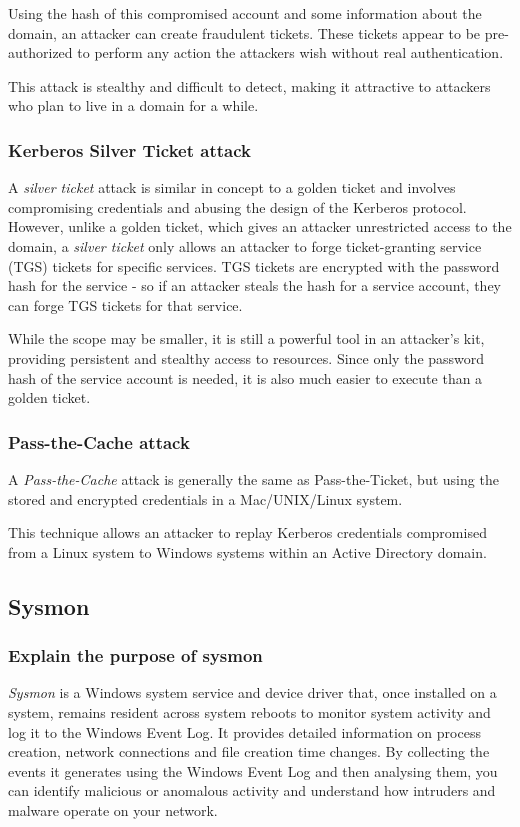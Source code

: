 Using the hash of this compromised account and some information about the domain, an attacker can create fraudulent tickets. These tickets appear to be pre-authorized to perform any action the attackers wish without real authentication.

This attack is stealthy and difficult to detect, making it attractive to attackers who plan to live in a domain for a while.

\subsubsection{Kerberos Silver Ticket attack}
A \textit{silver ticket} attack is similar in concept to a golden ticket and involves compromising credentials and abusing the design of the Kerberos protocol. However, unlike a golden ticket, which gives an attacker unrestricted access to the domain, a \textit{silver ticket} only allows an attacker to forge ticket-granting service (TGS) tickets for specific services. TGS tickets are encrypted with the password hash for the service - so if an attacker steals the hash for a service account, they can forge TGS tickets for that service.

While the scope may be smaller, it is still a powerful tool in an attacker's kit, providing persistent and stealthy access to resources. Since only the password hash of the service account is needed, it is also much easier to execute than a golden ticket.

\subsubsection{Pass-the-Cache attack}
A \textit{Pass-the-Cache} attack is generally the same as Pass-the-Ticket, but using the stored and encrypted credentials in a Mac/UNIX/Linux system.

This technique allows an attacker to replay Kerberos credentials compromised from a Linux system to Windows systems within an Active Directory domain.

\newpage

\subsection{Sysmon}

\subsubsection{Explain the purpose of sysmon}
\textit{Sysmon} is a Windows system service and device driver that, once installed on a system, remains resident across system reboots to monitor system activity and log it to the Windows Event Log. It provides detailed information on process creation, network connections and file creation time changes. By collecting the events it generates using the Windows Event Log and then analysing them, you can identify malicious or anomalous activity and understand how intruders and malware operate on your network.

